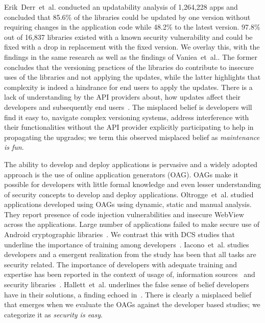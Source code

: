 \documentclass[conference]{IEEEtran}
\newcommand{\etal}[0]{et~al{.}}
\begin{document}
Erik~Derr~\etal{} conducted an updatability analysis of 1,264,228 apps and concluded that 85.6\% of the libraries could be updated by one version without requiring changes in the application code while 48.2\% to the latest version. 97.8\% out of 16,837 libraries existed with a known security vulnerability and could be fixed with a drop in replacement with the fixed version. We overlay this, with the findings in the same research as well as the findings of Vaniea~\etal{}. The former concludes that the versioning practices of the libraries do contribute to insecure uses of the libraries and not applying the updates, while the latter highlights that complexity is indeed a hindrance for end users to apply the updates. There is a lack of understanding by the API providers about, how updates affect their developers and subsequently end users~\cite{erikacar2017,vaniea2016}. The misplaced belief is developers will find it easy to, navigate complex versioning systems, address interference with their functionalities without the API provider explicitly participating to help in propagating the upgrades; we term this observed misplaced belief as \emph{maintenance is fun}.        

The ability to develop and deploy applications is pervasive and a widely adopted approach is the use of online application generators (OAG). OAGs make it possible for developers with little formal knowledge and even lesser understanding of security concepts to develop and deploy applications. Oltrogge~\etal{} studied applications developed using OAGs using dynamic, static and manual analysis. They report presence of code injection vulnerabilities and insecure WebView across the applications. Large number of applications failed to make secure use of Android cryptographic libraries~\cite{oltrogge2018rise}. We contrast this with \ac{DCS} studies that underline the importance of training among developers~\cite{thomas2018}. Iacono~\etal{} studies developers and a emergent realization from the study has been that all tasks are security related. The importance of developers with adequate training and expertise has been reported in the context of usage of, information sources~\cite{emmasurface2020} and security libraries~\cite{acarusability2017}. Hallett~\etal{} underlines the false sense of belief developers have in their solutions, a finding echoed in~\cite{thomas2018}. There is clearly a misplaced belief that emerges when we evaluate the OAGs against the developer based studies; we categorize it as \emph{security is easy}.  
\end{document}
